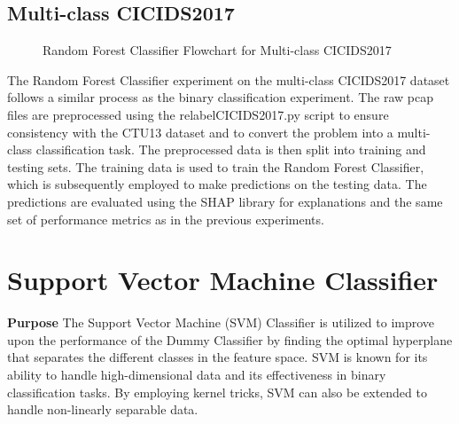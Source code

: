 \subsection{Multi-class CICIDS2017}
\begin{figure}[H]
\centering
{}
\caption{Random Forest Classifier Flowchart for Multi-class CICIDS2017}\label{fig:RandomForestFlowMultiCICIDS2017}
\end{figure}

The Random Forest Classifier experiment on the multi-class CICIDS2017 dataset follows a similar process as the binary classification experiment. The raw pcap files are preprocessed using the relabelCICIDS2017.py script to ensure consistency with the CTU13 dataset and to convert the problem into a multi-class classification task. The preprocessed data is then split into training and testing sets. The training data is used to train the Random Forest Classifier, which is subsequently employed to make predictions on the testing data. The predictions are evaluated using the SHAP library for explanations and the same set of performance metrics as in the previous experiments.

\section{Support Vector Machine Classifier}\label{sec:SVMClassifier}
\textbf{Purpose} The Support Vector Machine (SVM) Classifier is utilized to improve upon the performance of the Dummy Classifier by finding the optimal hyperplane that separates the different classes in the feature space. SVM is known for its ability to handle high-dimensional data and its effectiveness in binary classification tasks. By employing kernel tricks, SVM can also be extended to handle non-linearly separable data.

